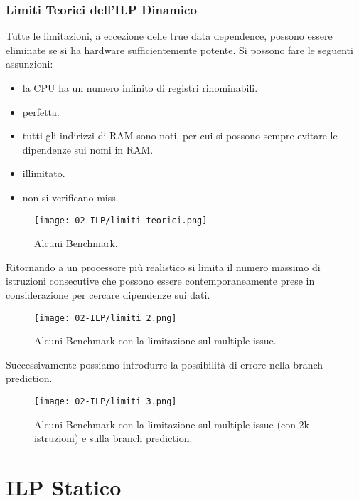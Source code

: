\subsubsection{Limiti Teorici dell'ILP Dinamico}

Tutte le limitazioni, a eccezione delle true data dependence, possono essere eliminate se si ha hardware sufficientemente potente. Si possono fare le seguenti assunzioni: 

\begin{itemize}
  \item {} la CPU ha un numero infinito di registri rinominabili. 
  \item {} perfetta. 
  \item {} tutti gli indirizzi di RAM sono noti, per cui si possono sempre evitare le dipendenze sui nomi in RAM.
\item {} illimitato. 
\item {} non si verificano miss.
\end{itemize}

\begin{figure}[!h]
    \centering
    \texttt{[image: 02-ILP/limiti teorici.png]}
    \caption{Alcuni Benchmark.}
\end{figure}

Ritornando a un processore più realistico si limita il numero massimo di istruzioni consecutive che possono essere contemporaneamente prese in considerazione per cercare dipendenze sui dati.

\begin{figure}[!h]
    \centering
    \texttt{[image: 02-ILP/limiti 2.png]}
    \caption{Alcuni Benchmark con la limitazione sul multiple issue.}
\end{figure}

Successivamente possiamo introdurre la possibilità di errore nella branch prediction. 

\begin{figure}[!h]
    \centering
    \texttt{[image: 02-ILP/limiti 3.png]}
    \caption{Alcuni Benchmark con la limitazione sul multiple issue (con 2k istruzioni) e sulla branch prediction.}
\end{figure}


\section{ILP Statico} 

















